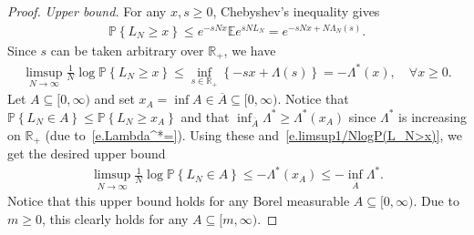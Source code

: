 \documentclass[11pt]{amsart}
\theoremstyle{remark}
\theoremstyle{definition}
\numberwithin{equation}{section}
\numberwithin{proposition}{section}
\numberwithin{figure}{section}
\numberwithin{table}{section}
\newcommand{\R}{\mathbb{R}}
\newcommand{\E}{\mathbb{E}}
\renewcommand{\P}{\mathbb{P}}
\renewcommand{\leq}{\leqslant}
\renewcommand{\geq}{\geqslant}
\renewcommand{\subset}{\subseteq}
\renewcommand{\bar}{\overline}
\newcommand{\Ll}{\left}
\newcommand{\Rr}{\right}
\newcommand{\1}{\mathbf{1}}
\begin{document}
\begin{proof}

\textit{Upper bound. }
For any $x,s\geq 0$, Chebyshev's inequality gives
\begin{align*}
    \P\Ll\{L_N\geq x\Rr\}\leq e^{-sNx}\E e^{sN L_N} = e^{-sNx+N\Lambda_N(s)}.
\end{align*}
Since $s$ can be taken arbitrary over $\R_+$, we have
\begin{align}\label{e.limsup1/NlogP(L_N>x)}
    \limsup_{N\to\infty}\frac{1}{N}\log\P\Ll\{L_N\geq x\Rr\}\leq \inf_{s\in\R_+}\Ll\{-sx + \Lambda(s)\Rr\} = - \Lambda^*(x),\quad\forall x \geq 0.
\end{align}
Let $A\subset [0,\infty)$ and set $x_A = \inf A\in\bar A\subset [0,\infty)$. Notice that $\P\Ll\{L_N\in A\Rr\}\leq \P\Ll\{L_N\geq x_A\Rr\}$ and that $\inf_{\bar A} \Lambda^*\geq \Lambda^*(x_A)$ since $\Lambda^*$ is increasing on $\R_+$ (due to~\eqref{e.Lambda^*=}). Using these and~\eqref{e.limsup1/NlogP(L_N>x)}, we get the desired upper bound
\begin{align*}    \limsup_{N\to\infty}\frac{1}{N}\log \P\Ll\{L_N\in A\Rr\}\leq -\Lambda^*(x_A) \leq - \inf_{\bar A}  \Lambda^*.
\end{align*}
Notice that this upper bound holds for any Borel measurable $A\subset[0,\infty)$. Due to $m\geq0$, this clearly holds for any $A\subset [m,\infty)$.


\end{proof}
\end{document}
